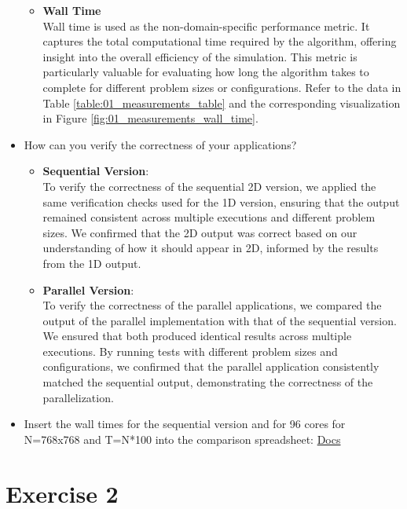 \documentclass[UTF-8]{article}
\begin{document}
\begin{itemize}
\begin{itemize}
                \item \textbf{Wall Time}\\
                Wall time is used as the non-domain-specific performance metric. It captures the total computational time required by the algorithm, offering insight into the overall efficiency of the simulation. This metric is particularly valuable for evaluating how long the algorithm takes to complete for different problem sizes or configurations. Refer to the data in Table \ref{table:01_measurements_table} and the corresponding visualization in Figure \ref{fig:01_measurements_wall_time}.
            \end{itemize}
    	\item How can you verify the correctness of your applications?
            \begin{itemize}
                \item \textbf{Sequential Version}:\\
                To verify the correctness of the sequential 2D version, we applied the same verification checks used for the 1D version, ensuring that the output remained consistent across multiple executions and different problem sizes. We confirmed that the 2D output was correct based on our understanding of how it should appear in 2D, informed by the results from the 1D output.
                \item \textbf{Parallel Version}:\\
                To verify the correctness of the parallel applications, we compared the output of the parallel implementation with that of the sequential version. We ensured that both produced identical results across multiple executions. By running tests with different problem sizes and configurations, we confirmed that the parallel application consistently matched the sequential output, demonstrating the correctness of the parallelization.                
            \end{itemize}
    	\item Insert the wall times for the sequential version and for 96 cores for N=768x768 and T=N*100 into the comparison spreadsheet: \href{https://docs.google.com/spreadsheets/d/1p6d9F12EtykmI2-7MnHkg0U15UAtaCvWz8Ip92ZEsWo}{Docs}
    \end{itemize}

    \newpage
    \section*{Exercise 2}
    
\end{document}
